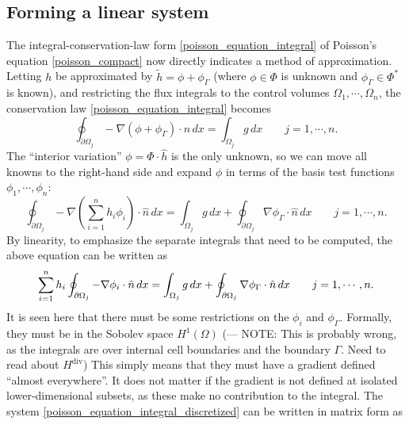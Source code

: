 \subsection{Forming a linear system}
The integral-conservation-law form \eqref{poisson_equation_integral} of Poisson's equation \eqref{poisson_compact}
now directly indicates a method of approximation. Letting $h$ be approximated by $\tilde{h} = \phi + \phi_\Gamma$ (where $\phi \in \Phi$ is unknown and $\phi_\Gamma \in \Phi^*$ is known),
and restricting the flux integrals to the control volumes $\Omega_1,\cdots,\Omega_n$, the conservation law \eqref{poisson_equation_integral} becomes
\begin{equation}\label{poisson_equation_integral_fvm}
    \oint_{\partial\Omega_j} -\nabla \left(\phi + \phi_\Gamma\right) \cdot \hat{n}\,dx = \int_{\Omega_j} g\,dx \quad\quad j=1,\cdots,n.
\end{equation}
The ``interior variation'' $\phi = \Phi\cdot \hat{h}$ is the only unknown, so we can move all knowns to the right-hand side
and expand $\phi$ in terms of the basis test functions $\phi_1,\cdots,\phi_n$:
\begin{equation}\label{poisson_equation_integral_fvm_knowns_unknowns}
    \oint_{\partial\Omega_j} -\nabla \left(\sum_{i=1}^nh_i\phi_i\right) \cdot \hat{n}\,dx =
            \int_{\Omega_j} g\,dx
            + \oint_{\partial\Omega_j} \nabla \phi_\Gamma \cdot \hat{n}\,dx
 \quad\quad j=1,\cdots,n.
\end{equation}
By linearity, to emphasize the separate integrals that need to be computed, the above equation can be written as
\begin{equation}\label{poisson_equation_integral_discretized}
    \sum_{i=1}^n h_i\oint_{{\partial\Omega}_j} -\nabla \phi_i \cdot \hat{n}\,dx =
            \int_{\Omega_j} g\,dx
            + \oint_{\partial\Omega_j} \nabla \phi_\Gamma \cdot \hat{n}\,dx
 \quad\quad j=1,\cdots,n.
\end{equation}
It is seen here that there must be some restrictions on the $\phi_i$ and $\phi_\Gamma$.
Formally, they must be in the Sobolev space $H^1(\Omega)$
(--- NOTE: This is probably wrong, as the integrals are over internal cell boundaries and the boundary $\Gamma$. Need to read
about $H^{\text{div}}$)
This simply means that they must have a gradient defined ``almost everywhere''.
It does not matter if the gradient is not defined at isolated lower-dimensional subsets, as these make no contribution to
the integral. The system \eqref{poisson_equation_integral_discretized} can be written in matrix form as
